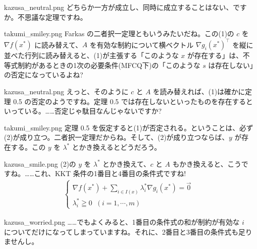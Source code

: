 \documentclass[b5paper,xelatex,ja=standard,10pt]{bxjsarticle}
\begin{document}
\begin{SERIFU}[colback=PaleIris, colbacktitle=PaleIris2]{kazusa_neutral.png}
どちらか一方が成立し、同時に成立することはない、ですか。不思議な定理ですね。
\end{SERIFU}

\begin{SERIFU}[colback=PaleGold, colbacktitle=PaleGold2]{takumi_smiley.png}
Farkas の二者択一定理ともいうみたいだね。この(1)の $c$ を $\nabla f(x^\ast)$ に読み替えて、$A$ を有効な制約について横ベクトル $\nabla g_i(x^\ast)^\top$ を縦に並べた行列に読み替えると、(1)が主張する「このような $x$ が存在する」は、不等式制約があるときの1次の必要条件(MFCQ下)の「このような $s$ は存在しない」の否定になっているよね?
\end{SERIFU}

\begin{SERIFU}[colback=PaleIris, colbacktitle=PaleIris2]{kazusa_neutral.png}
えっと、そのように $c$ と $A$ を読み替えれば、(1)は確かに定理 0.5 の否定のようですね。定理 0.5 では存在しないといったものを存在するといっている。……否定じゃ駄目なんじゃないですか?
\end{SERIFU}

\begin{SERIFU}[colback=PaleGold, colbacktitle=PaleGold2]{takumi_smiley.png}
定理 0.5 を仮定すると(1)が否定される。ということは、必ず(2)が成り立つ。二者択一定理だからね。そして、(2)が成り立つならば、$y$ が存在する。この $y$ を $\lambda^\ast$ とかき換えるとどうだろう。
\end{SERIFU}

\begin{SERIFU}[colback=PaleIris, colbacktitle=PaleIris2]{kazusa_smile.png}
(2)の $y$ を $\lambda^\ast$ とかき換えて、$c$ と $A$ もかき換えると、こうですね。……これ、KKT 条件の1番目と4番目の条件式ですね!
\begin{eqnarray*}
\left\{
\begin{array}{l}
\displaystyle \nabla f (x^\ast) + \sum_{i \in I(x)} \lambda^\ast_i \nabla g_i (x^\ast) = \vec{0} \\[5pt]
\lambda^\ast_i \geqq 0 \; \; (i = 1, \cdots, m)
\end{array}
\right.
\end{eqnarray*}
\end{SERIFU}

\begin{SERIFU}[colback=PaleIris, colbacktitle=PaleIris2]{kazusa_worried.png}
……でもよくみると、1番目の条件式の和が制約が有効な $i$ についてだけになってしまっていますね。それに、2番目と3番目の条件式も足りませんし。
\end{SERIFU}
\end{document}
